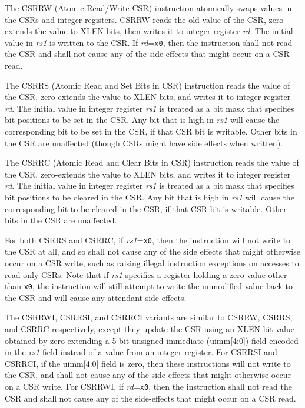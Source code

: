 The CSRRW (Atomic Read/Write CSR) instruction atomically swaps values
in the CSRs and integer registers. CSRRW reads the old value of the
CSR, zero-extends the value to XLEN bits, then writes it to integer
register {\em rd}.  The initial value in {\em rs1} is written to the
CSR.  If {\em rd}={\tt x0}, then the instruction shall not read the CSR
and shall not cause any of the side-effects that might occur on a CSR
read.

The CSRRS (Atomic Read and Set Bits in CSR) instruction reads the
value of the CSR, zero-extends the value to XLEN bits, and writes it
to integer register {\em rd}.  The initial value in integer register
{\em rs1} is treated as a bit mask that specifies bit positions to be
set in the CSR.  Any bit that is high in {\em rs1} will cause the
corresponding bit to be set in the CSR, if that CSR bit is writable.
Other bits in the CSR are unaffected (though CSRs might have side
effects when written).

The CSRRC (Atomic Read and Clear Bits in CSR) instruction reads the
value of the CSR, zero-extends the value to XLEN bits, and writes it
to integer register {\em rd}.  The initial value in integer register
{\em rs1} is treated as a bit mask that specifies bit positions to be
cleared in the CSR.  Any bit that is high in {\em rs1} will cause the
corresponding bit to be cleared in the CSR, if that CSR bit is
writable.  Other bits in the CSR are unaffected.

For both CSRRS and CSRRC, if {\em rs1}={\tt x0}, then the instruction
will not write to the CSR at all, and so shall not cause any of the
side effects that might otherwise occur on a CSR write, such as
raising illegal instruction exceptions on accesses to read-only CSRs.
Note that if {\em rs1} specifies a register holding a zero value other
than {\tt x0}, the instruction will still attempt to write the
unmodified value back to the CSR and will cause any attendant side effects.

The CSRRWI, CSRRSI, and CSRRCI variants are similar to CSRRW, CSRRS,
and CSRRC respectively, except they update the CSR using an XLEN-bit
value obtained by zero-extending a 5-bit unsigned immediate (uimm[4:0]) field
encoded in the {\em rs1} field instead of a value from an integer
register.  For CSRRSI and CSRRCI, if the uimm[4:0] field is zero, then
these instructions will not write to the CSR, and shall not cause any
of the side effects that might otherwise occur on a CSR write.  For
CSRRWI, if {\em rd}={\tt x0}, then the instruction shall not read the
CSR and shall not cause any of the side-effects that might occur on a
CSR read.

